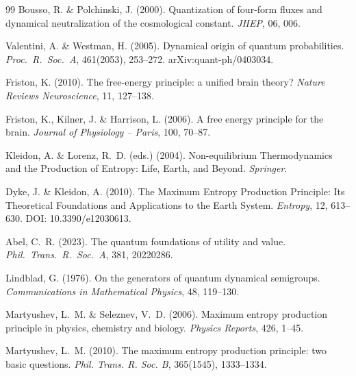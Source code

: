 \documentclass[12pt,a4paper]{article}
\theoremstyle{remark}
\begin{document}
{\begin{thebibliography}{99}
Bousso, R. \& Polchinski, J. (2000).
\newblock Quantization of four-form fluxes and dynamical neutralization of the cosmological constant.
\newblock \textit{JHEP}, 06, 006.

Valentini, A. \& Westman, H. (2005).
\newblock Dynamical origin of quantum probabilities.
\newblock \textit{Proc.\ R.\ Soc.\ A}, 461(2053), 253--272. arXiv:quant-ph/0403034.

Friston, K. (2010).
\newblock The free-energy principle: a unified brain theory?
\newblock \textit{Nature Reviews Neuroscience}, 11, 127--138.

Friston, K., Kilner, J. \& Harrison, L. (2006).
\newblock A free energy principle for the brain.
\newblock \textit{Journal of Physiology -- Paris}, 100, 70--87.

Kleidon, A. \& Lorenz, R.~D. (eds.) (2004).
\newblock Non-equilibrium Thermodynamics and the Production of Entropy: Life, Earth, and Beyond.
\newblock \textit{Springer}.

Dyke, J. \& Kleidon, A. (2010).
\newblock The Maximum Entropy Production Principle: Its Theoretical Foundations and Applications to the Earth System.
\newblock \textit{Entropy}, 12, 613--630.
\newblock DOI: 10.3390/e12030613.

Abel, C.~R. (2023).
\newblock The quantum foundations of utility and value.
\newblock \textit{Phil.\ Trans.\ R.\ Soc.\ A}, 381, 20220286.


Lindblad, G. (1976).
\newblock On the generators of quantum dynamical semigroups.
\newblock \textit{Communications in Mathematical Physics}, 48, 119--130.

Martyushev, L.~M. \& Seleznev, V.~D. (2006).
\newblock Maximum entropy production principle in physics, chemistry and biology.
\newblock \textit{Physics Reports}, 426, 1--45.

Martyushev, L.~M. (2010).
\newblock The maximum entropy production principle: two basic questions.
\newblock \textit{Phil. Trans. R. Soc. B}, 365(1545), 1333--1334.


\end{thebibliography}}
\end{document}
